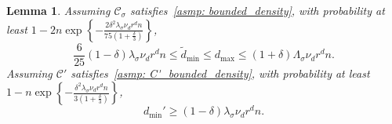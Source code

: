 \documentclass[11pt,twoside]{article}
\newtheorem{lemma}{Lemma}
\newcommand{\set}[1]{\left\{#1\right\}}
\newcommand{\1}{\mathbf{1}}
\newcommand{\Cset}{\mathcal{C}}
\newcommand{\Csig}{\Cset_{\sigma}}
\newcommand{\degminpr}{d_{\min}'}
\newcommand{\degminwt}{\widetilde{d}_{\min}}
\begin{document}
\begin{lemma}
	\noindent Assuming $\Csig$ satisfies~\ref{asmp: bounded_density}, with probability at least $1 - 2n\exp\set{-\frac{2 \delta^2 \lambda_{\sigma} \nu_d r^d n}{75(1 + \frac{\delta}{3})}}$,
	\begin{equation}
	\label{eqn:degwt_bound}
	\frac{6}{25}(1 - \delta)\lambda_{\sigma}\nu_dr^dn \leq \degminwt \leq d_{\max} \leq (1 + \delta) \Lambda_{\sigma} \nu_dr^dn.
	\end{equation}
	Assuming $\Cset'$ satisfies~\ref{asmp: C'_bounded_density}, with probability at least $1 - n\exp\set{-\frac{\delta^2 \lambda_{\sigma} \nu_d r^d n}{3(1 + \frac{\delta}{3})}}$,
	\begin{equation}
	\label{eqn:degpr_bound}
	\degminpr \geq (1 - \delta)\lambda_{\sigma}\nu_dr^dn.
	\end{equation}
\end{lemma}
\end{document}
